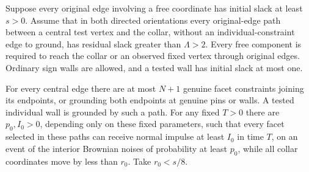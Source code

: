 \begin{lemma}\label{c:force}
Suppose every original edge involving a free coordinate has initial
slack at least $s>0$. Assume that in both directed orientations every
original-edge path between a central test vertex and the collar, without
an individual-constraint edge to ground, has residual slack greater
than $\Lambda>2$. Every free component is required to reach the collar
or an observed fixed vertex through original edges. Ordinary sign walls
are allowed, and a tested wall has initial slack at most one.

For every central edge there are at most $N+1$ genuine facet constraints
joining its endpoints, or grounding both endpoints at genuine pins or
walls. A tested individual wall is grounded by such a path. For any fixed
$T>0$ there are $p_0,I_0>0$, depending only on these fixed parameters,
such that every facet selected in these paths can receive normal impulse
at least $I_0$ in time $T$, on an event of the interior Brownian noises
of probability at least $p_0$, while all collar coordinates move by less
than $r_0$. Take $r_0<s/8$.
\end{lemma}
